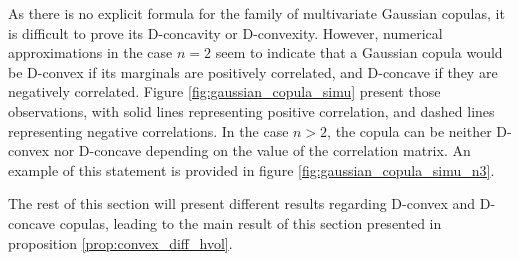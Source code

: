 \begin{remark}
    As there is no explicit formula for the family of multivariate Gaussian copulas, it is difficult to prove its D-concavity or D-convexity. However, numerical approximations in the case $n=2$ seem to indicate that a Gaussian copula would be D-convex if its marginals are positively correlated, and D-concave if they are negatively correlated. Figure \ref{fig:gaussian_copula_simu} present those observations, with solid lines representing positive correlation, and dashed lines representing negative correlations. In the case $n>2$, the copula can be neither D-convex nor D-concave depending on the value of the correlation matrix. An example of this statement is provided in figure \ref{fig:gaussian_copula_simu_n3}.
\end{remark}

The rest of this section will present different results regarding D-convex and D-concave copulas, leading to the main result of this section presented in proposition \ref{prop:convex_diff_hvol}.

